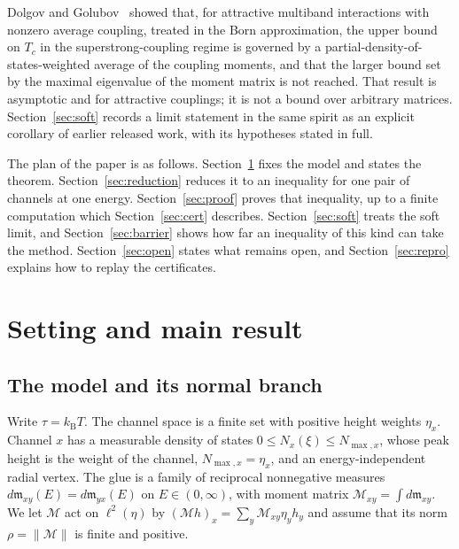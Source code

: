 \documentclass[10pt]{article}
\theoremstyle{remark}
\newcommand{\kB}{k_{\mathrm B}}
\begin{document}
Dolgov and Golubov~\cite{dolgov} showed that, for attractive multiband interactions with nonzero average coupling, treated in the Born approximation, the upper bound on $T_c$ in the superstrong-coupling regime is governed by a partial-density-of-states-weighted average of the coupling moments, and that the larger bound set by the maximal eigenvalue of the moment matrix is not reached. That result is asymptotic and for attractive couplings; it is not a bound over arbitrary matrices. Section~\ref{sec:soft} records a limit statement in the same spirit as an explicit corollary of earlier released work, with its hypotheses stated in full.

The plan of the paper is as follows. Section~\ref{sec:setting} fixes the model and states the theorem. Section~\ref{sec:reduction} reduces it to an inequality for one pair of channels at one energy. Section~\ref{sec:proof} proves that inequality, up to a finite computation which Section~\ref{sec:cert} describes. Section~\ref{sec:soft} treats the soft limit, and Section~\ref{sec:barrier} shows how far an inequality of this kind can take the method. Section~\ref{sec:open} states what remains open, and Section~\ref{sec:repro} explains how to replay the certificates.

\section{Setting and main result}\label{sec:setting}

\subsection{The model and its normal branch}

Write $\tau=\kB T$. The channel space is a finite set with positive height weights $\eta_x$. Channel $x$ has a measurable density of states $0\le N_x(\xi)\le N_{\max,x}$, whose peak height is the weight of the channel, $N_{\max,x}=\eta_x$, and an energy-independent radial vertex. The glue is a family of reciprocal nonnegative measures $d\mathfrak m_{xy}(E)=d\mathfrak m_{yx}(E)$ on $E\in(0,\infty)$, with moment matrix $\mathcal M_{xy}=\int d\mathfrak m_{xy}$. We let $\mathcal M$ act on $\ell^2(\eta)$ by $(\mathcal M h)_x=\sum_y\mathcal M_{xy}\eta_yh_y$ and assume that its norm $\rho=\|\mathcal M\|$ is finite and positive.
\end{document}
